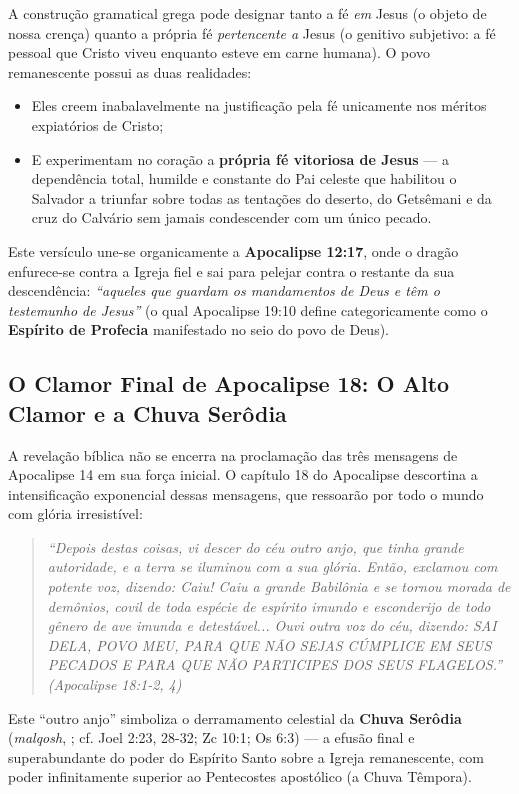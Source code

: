 \documentclass[11pt,a4paper,openany]{book}
\begin{document}
A construção gramatical grega pode designar tanto a fé \textit{em} Jesus (o objeto de nossa crença) quanto a própria fé \textit{pertencente a} Jesus (o genitivo subjetivo: a fé pessoal que Cristo viveu enquanto esteve em carne humana). O povo remanescente possui as duas realidades:
\begin{itemize}
  \item Eles creem inabalavelmente na justificação pela fé unicamente nos méritos expiatórios de Cristo;
  \item E experimentam no coração a \textbf{própria fé vitoriosa de Jesus} — a dependência total, humilde e constante do Pai celeste que habilitou o Salvador a triunfar sobre todas as tentações do deserto, do Getsêmani e da cruz do Calvário sem jamais condescender com um único pecado.
\end{itemize}


Este versículo une-se organicamente a \textbf{Apocalipse 12:17}, onde o dragão enfurece-se contra a Igreja fiel e sai para pelejar contra o restante da sua descendência: \textit{``aqueles que guardam os mandamentos de Deus e têm o testemunho de Jesus''} (o qual Apocalipse 19:10 define categoricamente como o \textbf{Espírito de Profecia} manifestado no seio do povo de Deus).



\subsection{O Clamor Final de Apocalipse 18: O Alto Clamor e a Chuva Serôdia}


A revelação bíblica não se encerra na proclamação das três mensagens de Apocalipse 14 em sua força inicial. O capítulo 18 do Apocalipse descortina a intensificação exponencial dessas mensagens, que ressoarão por todo o mundo com glória irresistível:


\begin{quote}
\itshape \textit{``Depois destas coisas, vi descer do céu outro anjo, que tinha grande autoridade, e a terra se iluminou com a sua glória. Então, exclamou com potente voz, dizendo: Caiu! Caiu a grande Babilônia e se tornou morada de demônios, covil de toda espécie de espírito imundo e esconderijo de todo gênero de ave imunda e detestável... Ouvi outra voz do céu, dizendo: SAI DELA, POVO MEU, PARA QUE NÃO SEJAS CÚMPLICE EM SEUS PECADOS E PARA QUE NÃO PARTICIPES DOS SEUS FLAGELOS.''} (Apocalipse 18:1-2, 4)
\end{quote}


Este ``outro anjo'' simboliza o derramamento celestial da \textbf{Chuva Serôdia} (\textit{malqosh}, ; cf. Joel 2:23, 28-32; Zc 10:1; Os 6:3) — a efusão final e superabundante do poder do Espírito Santo sobre a Igreja remanescente, com poder infinitamente superior ao Pentecostes apostólico (a Chuva Têmpora).
\end{document}
